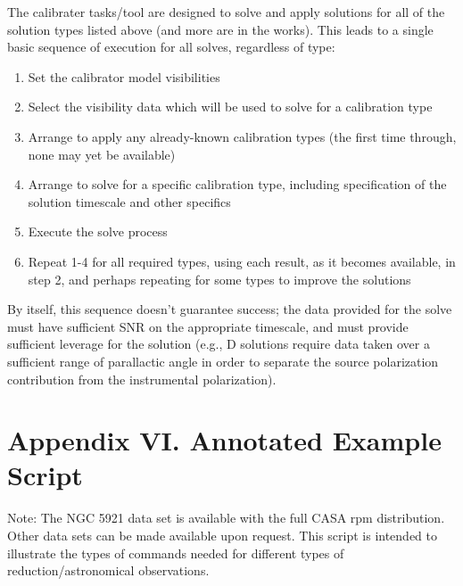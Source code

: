 \vspace{3mm}

The calibrater tasks/tool are designed to solve and apply solutions
for all of the solution types listed above (and more are in the
works). This leads to a single basic sequence of execution for all
solves, regardless of type: 

\begin{enumerate}
   \item Set the calibrator model visibilities
   \item Select the visibility data which will be used to solve for a
      calibration type 
   \item Arrange to apply any already-known calibration types (the first
      time through, none may yet be available) 
   \item Arrange to solve for a specific calibration type, including
      specification of the solution timescale and other specifics 
   \item Execute the solve process
   \item Repeat 1-4 for all required types, using each result, as it
      becomes available, in step 2, and perhaps repeating for some types
      to improve the solutions  
\end{enumerate}

By itself, this sequence doesn't guarantee success; the data provided
for the solve must have sufficient SNR on the appropriate timescale,
and must provide sufficient leverage for the solution (e.g., D
solutions require data taken over a sufficient range of parallactic
angle in order to separate the source polarization contribution from
the instrumental polarization). 


\chapter{Appendix VI. Annotated Example Script}
\label{chapter:app.6}

Note: The NGC 5921 data set is available with the full
CASA rpm distribution.  Other data sets can be made available upon
request.  This script is intended to illustrate the types of
commands needed for different types of reduction/astronomical
observations.

